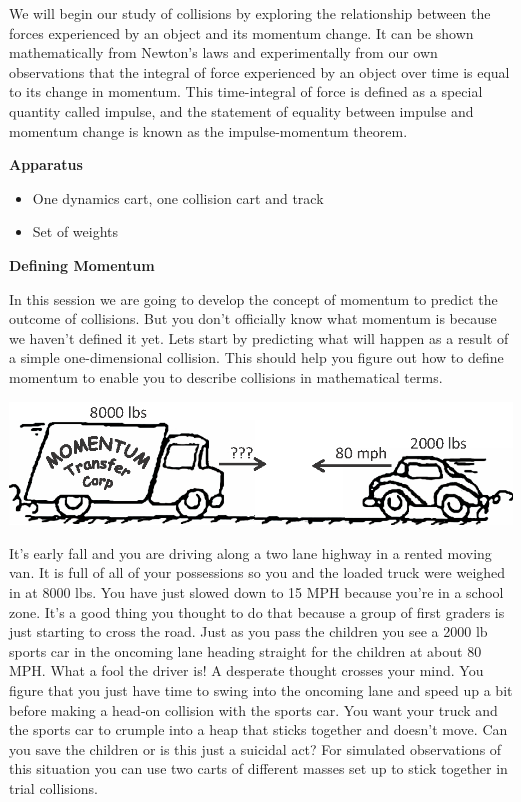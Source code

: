 We will begin our study of collisions by exploring the relationship between
the forces experienced by an object and its momentum change. It can be shown
mathematically from Newton's laws and experimentally from our own observations
that the integral of force experienced by an object over time is equal to its
change in momentum. This time-integral of force is defined as a special quantity
called impulse, and the statement of equality between impulse and momentum change
is known as the impulse-momentum theorem.

\textbf{Apparatus} 

\begin{itemize}
\item One dynamics cart, one collision cart and track
\item Set of weights
\end{itemize}
\textbf{Defining Momentum }

In this session we are going to develop the concept of momentum to predict the
outcome of collisions. But you don't officially know what momentum is because
we haven't defined it yet. Lets start by predicting what will happen as a result
of a simple one-dimensional collision. This should help you figure out how to
define momentum to enable you to describe collisions in mathematical terms.

{\par\centering \includegraphics{momentum/car_and_van.eps} \par}

It's early fall and you are driving along a two lane highway in a rented moving
van. It is full of all of your possessions so you and the loaded truck were
weighed in at 8000 lbs. You have just slowed down to 15 MPH because you're in
a school zone. It's a good thing you thought to do that because a group of first
graders is just starting to cross the road. Just as you pass the children you
see a 2000 lb sports car in the oncoming lane heading straight for the children
at about 80 MPH. What a fool the driver is! A desperate thought crosses your
mind. You figure that you just have time to swing into the oncoming lane and
speed up a bit before making a head-on collision with the sports car. You want
your truck and the sports car to crumple into a heap that sticks together and
doesn't move. Can you save the children or is this just a suicidal act? For
simulated observations of this situation you can use two carts of different
masses set up to stick together in trial collisions. 

